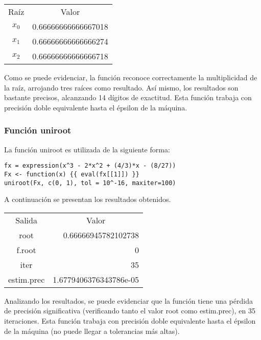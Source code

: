 \documentclass[a4paper,12pt]{article}
\begin{document}
\begin{table}[ht!]
\begin{tabular}{cr}
Raíz & \multicolumn{1}{c}{Valor}  \\
$x_0$ & 0.66666666666667018       \\
$x_1$ & 0.66666666666666274       \\
$x_2$ & 0.66666666666666718      
\end{tabular}
\end{table}

Como se puede evidenciar, la función reconoce correctamente la multiplicidad de la raíz, arrojando tres raíces como resultado. Así mismo, los resultados son bastante precisos, alcanzando 14 dígitos de exactitud. Esta función trabaja con precisión doble equivalente hasta el épsilon de la máquina. \par

\subsubsection{Función uniroot}

La función uniroot es utilizada de la siguiente forma: \par

\begin{verbatim}
fx = expression(x^3 - 2*x^2 + (4/3)*x - (8/27))
Fx <- function(x) {{ eval(fx[[1]]) }}
uniroot(Fx, c(0, 1), tol = 10^-16, maxiter=100)
\end{verbatim}

A continuación se presentan los resultados obtenidos. \par

\begin{table}[ht!]
\begin{tabular}{cr}
Salida     & \multicolumn{1}{c}{Valor}                  \\
root       & 0.66666945782102738                        \\
f.root     & 0                                          \\
iter       & 35                                         \\
estim.prec & \multicolumn{1}{l}{1.6779406376343786e-05}
\end{tabular}
\end{table}

Analizando los resultados, se puede evidenciar que la función tiene una pérdida de precisión significativa (verificando tanto el valor root como estim.prec), en 35 iteraciones. Esta función trabaja con precisión doble equivalente hasta el épsilon de la máquina (no puede llegar a tolerancias más altas). \par
\end{document}
